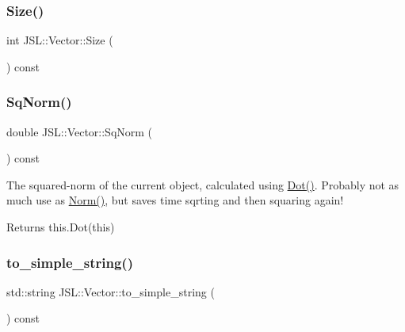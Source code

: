 \mbox{\label{classJSL_1_1Vector_a53b26ca32061ebf41430fe2322f79c0c}} 
\subsubsection{\texorpdfstring{Size()}{Size()}}
{\footnotesize\ttfamily int J\+S\+L\+::\+Vector\+::\+Size (\begin{DoxyParamCaption}{ }\end{DoxyParamCaption}) const\hspace{0.3cm}{\ttfamily [inline]}}

\mbox{\label{classJSL_1_1Vector_ac1346e26bc981bf45d2c1c4317dac4e6}} 
\subsubsection{\texorpdfstring{Sq\+Norm()}{SqNorm()}}
{\footnotesize\ttfamily double J\+S\+L\+::\+Vector\+::\+Sq\+Norm (\begin{DoxyParamCaption}{ }\end{DoxyParamCaption}) const\hspace{0.3cm}{\ttfamily [inline]}}



The squared-\/norm of the current object, calculated using \hyperlink{classJSL_1_1Vector_a60660b5a26e0ddace46f31699834b671}{Dot()}. Probably not as much use as \hyperlink{classJSL_1_1Vector_aa8af717591f5548ff471b6e4b28d7f9c}{Norm()}, but saves time sqrting and then squaring again! 

\begin{DoxyReturn}{Returns}
this.\+Dot(this) 
\end{DoxyReturn}
\mbox{\label{classJSL_1_1Vector_ad2d0bfdb432809a88a49f4576b0afb5a}} 
\subsubsection{\texorpdfstring{to\+\_\+simple\+\_\+string()}{to\_simple\_string()}}
{\footnotesize\ttfamily std\+::string J\+S\+L\+::\+Vector\+::to\+\_\+simple\+\_\+string (\begin{DoxyParamCaption}{ }\end{DoxyParamCaption}) const\hspace{0.3cm}{\ttfamily [inline]}}

